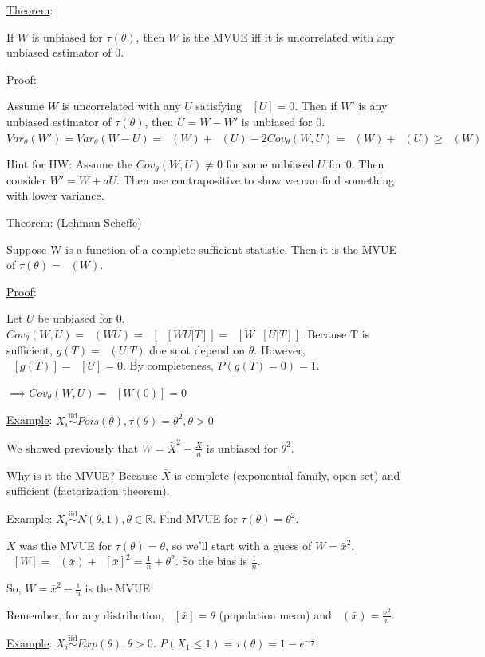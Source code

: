 \documentclass{article}
\DeclareMathOperator{\EX}{\mathbb{E}} %
\DeclareMathOperator{\ext}{\EX_{\theta}} %
\DeclareMathOperator{\vart}{Var_{\theta}} %
\newcommand{\real}{\mathbb{R}} %
\newcommand{\iiddist}{\overset{\mathrm{iid}}{\sim}}
\begin{document}
\underline{Theorem}:

If $W$ is unbiased for $\tau(\theta)$, then $W$ is the MVUE iff it is uncorrelated with any unbiased estimator of 0. 

\underline{Proof}:

Assume $W$ is uncorrelated with any $U$ satisfying $\ext[U] = 0$. Then if $W'$ is any unbiased estimator of $\tau(\theta)$, then $U = W - W'$ is unbiased for 0. $Var_{\theta}(W') = Var_{\theta}(W - U) = \vart(W) + \vart(U) - 2 Cov_{\theta}(W, U) = \vart(W) + \vart(U) \ge \vart(W)$ 

Hint for HW: Assume the $Cov_{\theta}(W, U) \neq 0$ for some unbiased $U$ for 0. Then consider $W' = W + aU$. Then use contrapositive to show we can find something with lower variance. 

\underline{Theorem}: (Lehman-Scheffe)

Suppose W is a function of a complete sufficient statistic. Then it is the MVUE of $\tau(\theta) = \ext(W)$.

\underline{Proof}:

Let $U$ be unbiased for 0. $Cov_{\theta}(W, U) = \ext(WU) = \ext[\ext[WU|T]] = \ext[W \ext[U|T]]$. Because T is sufficient, $g(T) = \ext(U|T)$ doe snot depend on $\theta$. However, $\ext[g(T)] = \ext[U] = 0$. By completeness, $P(g(T) = 0) = 1$.

$\implies Cov_{\theta}(W, U) = \ext[W (0)] = 0$


\underline{Example}: $X_i \iiddist Pois(\theta), \tau(\theta) = \theta^2, \theta > 0$

We showed previously that $W = \bar{X}^2 - \frac{\bar{X}}{n}$ is unbiased for $\theta^2$.

Why is it the MVUE? Because $\bar{X}$ is complete (exponential family, open set) and sufficient (factorization theorem). 


\underline{Example}: $X_i \iiddist N(\theta, 1), \theta \in \real$. Find MVUE for $\tau(\theta) = \theta^2$. 

$\bar{X}$ was the MVUE for $\tau(\theta) = \theta$, so we'll start with a guess of $W = \bar{x}^2$. $\ext[W] = \vart(\bar{x}) + \ext[\bar{x}]^2 = \frac{1}{n} + \theta^2$. So the bias is $\frac{1}{n}$. 

So, $W = \bar{x}^2 - \frac{1}{n}$ is the MVUE.

Remember, for any distribution, $\ext[\bar{x}] = \theta$ (population mean) and $\vart(\bar{x}) = \frac{\sigma^2}{n}$.

\underline{Example}: $X_i \iiddist Exp(\theta), \theta > 0$. $P(X_1 \le 1) = \tau(\theta) = 1-e^{-\frac{1}{\theta}}$.
\end{document}
